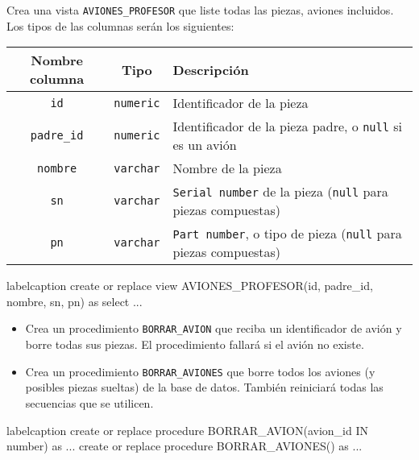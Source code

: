 \begin{homeworkProblem}

  Crea una vista \texttt{AVIONES\_PROFESOR} que liste todas las piezas, aviones incluidos. Los tipos de las columnas serán los siguientes:
  
  \begin{center}
    \begin{tabular}{|c|c|p{10cm}|}
      \hline
      \textbf{Nombre columna} & \textbf{Tipo} & \textbf{Descripción} \\ 
      \hline
      \texttt{id} & \texttt{numeric} & Identificador de la pieza \\
      \texttt{padre\_id} & \texttt{numeric} & Identificador de la pieza padre, o \texttt{null} si es un avión\\
      \texttt{nombre} & \texttt{varchar} & Nombre de la pieza \\
      \texttt{sn} & \texttt{varchar} & \texttt{Serial number} de la pieza (\texttt{null} para piezas compuestas)\\
      \texttt{pn} & \texttt{varchar} & \texttt{Part number}, o tipo de pieza (\texttt{null} para piezas compuestas)\\
      \hline
    \end{tabular}
  \end{center}

  \begin{listadosql}{label}{caption}
create or replace view AVIONES_PROFESOR(id, padre_id, nombre, sn, pn) as
select ...
\end{listadosql}

\end{homeworkProblem}

\needspace{.25\textheight}
\begin{homeworkProblem}
  \begin{itemize}
  \item Crea un procedimiento \texttt{BORRAR\_AVION} que reciba un identificador de avión y borre
    todas sus piezas. El procedimiento fallará si el avión no existe.
  \item Crea un procedimiento \texttt{BORRAR\_AVIONES} que borre todos los aviones (y posibles piezas
    sueltas) de la base de datos. También reiniciará todas las secuencias que se utilicen.
  \end{itemize}

  \begin{listadosql}{label}{caption}
create or replace procedure BORRAR_AVION(avion_id IN number) as ... 
create or replace procedure BORRAR_AVIONES() as ...
\end{listadosql}

\end{homeworkProblem}

